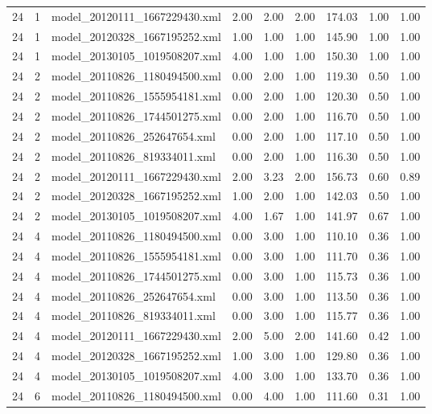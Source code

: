 \begin{table}[ht]
\begin{tabular}{rrlrrrrrr}
   24 &   1 & model\_20120111\_1667229430.xml & 2.00 & 2.00 & 2.00 & 174.03 & 1.00 & 1.00 \\ 
   24 &   1 & model\_20120328\_1667195252.xml & 1.00 & 1.00 & 1.00 & 145.90 & 1.00 & 1.00 \\ 
   24 &   1 & model\_20130105\_1019508207.xml & 4.00 & 1.00 & 1.00 & 150.30 & 1.00 & 1.00 \\ 
   24 &   2 & model\_20110826\_1180494500.xml & 0.00 & 2.00 & 1.00 & 119.30 & 0.50 & 1.00 \\ 
   24 &   2 & model\_20110826\_1555954181.xml & 0.00 & 2.00 & 1.00 & 120.30 & 0.50 & 1.00 \\ 
   24 &   2 & model\_20110826\_1744501275.xml & 0.00 & 2.00 & 1.00 & 116.70 & 0.50 & 1.00 \\ 
   24 &   2 & model\_20110826\_252647654.xml & 0.00 & 2.00 & 1.00 & 117.10 & 0.50 & 1.00 \\ 
   24 &   2 & model\_20110826\_819334011.xml & 0.00 & 2.00 & 1.00 & 116.30 & 0.50 & 1.00 \\ 
   24 &   2 & model\_20120111\_1667229430.xml & 2.00 & 3.23 & 2.00 & 156.73 & 0.60 & 0.89 \\ 
   24 &   2 & model\_20120328\_1667195252.xml & 1.00 & 2.00 & 1.00 & 142.03 & 0.50 & 1.00 \\ 
   24 &   2 & model\_20130105\_1019508207.xml & 4.00 & 1.67 & 1.00 & 141.97 & 0.67 & 1.00 \\ 
   24 &   4 & model\_20110826\_1180494500.xml & 0.00 & 3.00 & 1.00 & 110.10 & 0.36 & 1.00 \\ 
   24 &   4 & model\_20110826\_1555954181.xml & 0.00 & 3.00 & 1.00 & 111.70 & 0.36 & 1.00 \\ 
   24 &   4 & model\_20110826\_1744501275.xml & 0.00 & 3.00 & 1.00 & 115.73 & 0.36 & 1.00 \\ 
   24 &   4 & model\_20110826\_252647654.xml & 0.00 & 3.00 & 1.00 & 113.50 & 0.36 & 1.00 \\ 
   24 &   4 & model\_20110826\_819334011.xml & 0.00 & 3.00 & 1.00 & 115.77 & 0.36 & 1.00 \\ 
   24 &   4 & model\_20120111\_1667229430.xml & 2.00 & 5.00 & 2.00 & 141.60 & 0.42 & 1.00 \\ 
   24 &   4 & model\_20120328\_1667195252.xml & 1.00 & 3.00 & 1.00 & 129.80 & 0.36 & 1.00 \\ 
   24 &   4 & model\_20130105\_1019508207.xml & 4.00 & 3.00 & 1.00 & 133.70 & 0.36 & 1.00 \\ 
   24 &   6 & model\_20110826\_1180494500.xml & 0.00 & 4.00 & 1.00 & 111.60 & 0.31 & 1.00 \\ 

\end{tabular}
\end{table}
